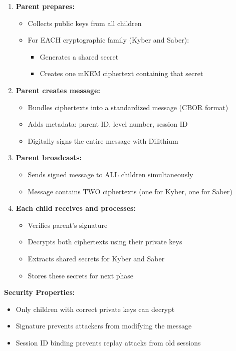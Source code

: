 \documentclass[12pt,a4paper]{report}
\begin{document}
\begin{enumerate}
\item \textbf{Parent prepares:}
\begin{itemize}
\item Collects public keys from all children
\item For EACH cryptographic family (Kyber and Saber):
\begin{itemize}
\item Generates a shared secret
\item Creates one mKEM ciphertext containing that secret
\end{itemize}
\end{itemize}

\item \textbf{Parent creates message:}
\begin{itemize}
\item Bundles ciphertexts into a standardized message (CBOR format)
\item Adds metadata: parent ID, level number, session ID
\item Digitally signs the entire message with Dilithium
\end{itemize}

\item \textbf{Parent broadcasts:}
\begin{itemize}
\item Sends signed message to ALL children simultaneously
\item Message contains TWO ciphertexts (one for Kyber, one for Saber)
\end{itemize}

\item \textbf{Each child receives and processes:}
\begin{itemize}
\item Verifies parent's signature
\item Decrypts both ciphertexts using their private keys
\item Extracts shared secrets for Kyber and Saber
\item Stores these secrets for next phase
\end{itemize}
\end{enumerate}

\textbf{Security Properties:}
\begin{itemize}
\item Only children with correct private keys can decrypt
\item Signature prevents attackers from modifying the message
\item Session ID binding prevents replay attacks from old sessions
\end{itemize}
\end{document}
